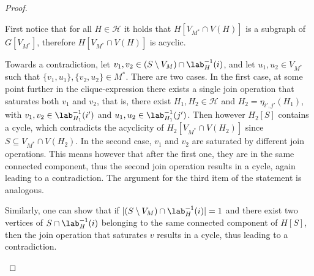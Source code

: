 \begin{proof}
    \begin{claimproof}
        First notice that for all $H \in \mathcal{H}$ it holds that $H[V_{M^*} \cap V(H)]$ is a subgraph of $G[V_{M^*}]$,
        therefore $H[V_{M^*} \cap V(H)]$ is acyclic.

        Towards a contradiction, let $v_1,v_2 \in (S \setminus V_M) \cap \lab^{-1}_H(i)$,
        and let $u_1,u_2 \in V_{M^*}$ such that $\{v_1,u_1\}, \{v_2,u_2\} \in M^*$.
        There are two cases.
        In the first case, at some point further in the clique-expression there exists a single join operation
        that saturates both $v_1$ and $v_2$, that is,
        there exist $H_1,H_2 \in \mathcal{H}$ and $H_2 = \eta_{i',j'}(H_1)$,
        with $v_1,v_2 \in \lab^{-1}_{H_1}(i')$ and $u_1,u_2 \in \lab^{-1}_{H_1}(j')$.
        Then however $H_2[S]$ contains a cycle, which contradicts the acyclicity of $H_2[V_{M^*} \cap V(H_2)]$
        since $S \subseteq V_{M^*} \cap V(H_2)$.
        In the second case, $v_1$ and $v_2$ are saturated by different join operations.
        This means however that after the first one, they are in the same connected component,
        thus the second join operation results in a cycle, again leading to a contradiction.
        The argument for the third item of the statement is analogous.

        Similarly, one can show that if $|(S \setminus V_M) \cap \lab^{-1}_H(i)| = 1$
        and there exist two vertices of $S \cap \lab^{-1}_H(i)$ belonging to the same connected component of $H[S]$,
        then the join operation that saturates $v$ results in a cycle, thus leading to a contradiction.
    \end{claimproof}



\end{proof}
